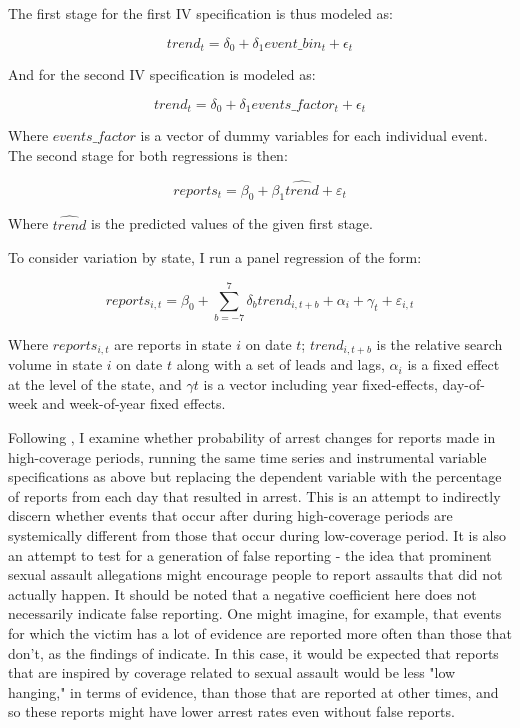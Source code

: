 \documentclass[AER,draftmode]{AEA}
\begin{document}
The first stage for the first IV specification is thus modeled as:

$$ 
trend_{t} = \delta_{0} + \delta_1 event\_bin_t + \epsilon_{t}
$$

And for the second IV specification is modeled as:

$$ 
trend_{t} = \delta_{0} + \delta_1 events\_factor_t + \epsilon_{t}
$$

Where $events\_factor$ is a vector of dummy variables for each individual event. The second stage for both regressions is then:

$$ 
reports_{t} = \beta_{0} + \beta_1 \hat{trend} + \varepsilon_{t}
$$

Where $\hat{trend}$ is the predicted values of the given first stage. 

To consider variation by state, I run a panel regression of the form:

$$ 
reports_{i,t} = \beta_{0} + \sum_{b=-7}^{7} \delta_{b} trend_{i,t+b} + \alpha_{i} + \gamma_{t} + \varepsilon_{i,t}
$$

Where $reports_{i,t}$ are reports in state $i$ on date $t$; $trend_{i,t+b}$ is the relative search volume in state $i$ on date $t$ along with a set of leads and lags, $\alpha_{i}$ is a fixed effect at the level of the state, and $\gamma{t}$ is a vector including year fixed-effects, day-of-week and week-of-year fixed effects. 

Following , I examine whether probability of arrest changes for reports made in high-coverage periods, running the same time series and instrumental variable specifications as above but replacing the dependent variable with the percentage of reports from each day that resulted in arrest. This is an attempt to indirectly discern whether events that occur after during high-coverage periods are systemically different from those that occur during low-coverage period. It is also an attempt to test for a generation of false reporting - the idea that prominent sexual assault allegations might encourage people to report assaults that did not actually happen. It should be noted that a negative coefficient here does not necessarily indicate false reporting. One might imagine, for example, that events for which the victim has a lot of evidence are reported more often than those that don't, as the findings of  indicate. In this case, it would be expected that reports that are inspired by coverage related to sexual assault would be less "low hanging," in terms of evidence, than those that are reported at other times, and so these reports might have lower arrest rates even without false reports. 
\end{document}
